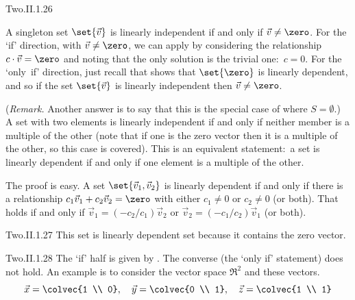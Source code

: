 \begin{ans}{Two.II.1.26}
      \begin{exparts}
        \partsitem A singleton set $\set{\vec{v}}$ is linearly independent
          if and only if $\vec{v}\neq\zero$.
          For the `if' direction, with $\vec{v}\neq\zero$,
          we can apply  by considering
          the relationship
          \( c\cdot\vec{v}=\zero \) and noting that the only solution
          is the trivial one:~$c=0$.
          For the `only~if' direction, just recall that
          shows that $\set{\zero}$ is linearly dependent, and so if the set
          $\set{\vec{v}}$ is linearly independent then $\vec{v}\neq\zero$.

          (\textit{Remark.}
          Another answer is to say that this is the special case of
           where \( S=\emptyset \).)
        \partsitem A set with two elements is linearly independent
          if and only if neither member is a  multiple of the other
          (note that if one is the zero vector then it is a multiple of the
          other, so this case is covered).
          This is an equivalent statement:~a set is linearly dependent if and
          only if one element is a multiple of the other.

          The proof is easy.
          A set $\set{\vec{v}_1,\vec{v}_2}$ is linearly dependent if and only
          if there is a relationship $c_1\vec{v}_1+c_2\vec{v}_2=\zero$
          with either $c_1\neq 0$ or $c_2\neq 0$ (or both).
          That holds if and only if $\vec{v}_1=(-c_2/c_1)\vec{v}_2$
          or $\vec{v}_2=(-c_1/c_2)\vec{v}_1$ (or both).
       \end{exparts}
     
\end{ans}
\begin{ans}{Two.II.1.27}
      This set is linearly dependent set because it contains the zero vector.
    
\end{ans}
\begin{ans}{Two.II.1.28}
      The `if' half is given by .
      The converse (the `only if' statement) does not hold.
      An example is to consider the vector space \( \Re^2 \) and
      these vectors.
      \begin{equation*}
         \vec{x}=\colvec{1 \\ 0},\quad
         \vec{y}=\colvec{0 \\ 1},\quad
         \vec{z}=\colvec{1 \\ 1}
      \end{equation*}
    
\end{ans}
